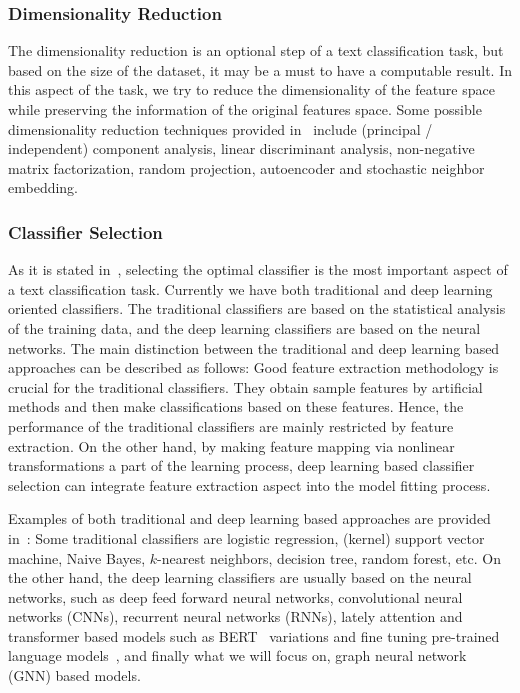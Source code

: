 \subsubsection{Dimensionality Reduction}
The dimensionality reduction is an optional step of a text classification task, but based on the size of the dataset, it may be a must to have a computable result. In this aspect of the task, we try to reduce the dimensionality of the feature space while preserving the information of the original features space. Some possible dimensionality reduction techniques provided in~\autocite{kowsari19tc} include (principal / independent) component analysis, linear discriminant analysis, non-negative matrix factorization, random projection, autoencoder and stochastic neighbor embedding.

\subsubsection{Classifier Selection}
As it is stated in~\autocite{li20tc}, selecting the optimal classifier is the most important aspect of a text classification task. Currently we have both traditional and deep learning oriented classifiers. The traditional classifiers are based on the statistical analysis of the training data, and the deep learning classifiers are based on the neural networks. The main distinction between the traditional and deep learning based approaches can be described as follows: Good feature extraction methodology is crucial for the traditional classifiers. They obtain sample features by artificial methods and then make classifications based on these features. Hence, the performance of the traditional classifiers are mainly restricted by feature extraction. On the other hand, by making feature mapping via nonlinear transformations a part of the learning process, deep learning based classifier selection can integrate feature extraction aspect into the model fitting process.

Examples of both traditional and deep learning based approaches are provided in~\autocite{kowsari19tc,li20tc,minaee20tc}: Some traditional classifiers are logistic regression, (kernel) support vector machine, Naive Bayes, \(k\)-nearest neighbors, decision tree, random forest, etc. On the other hand, the deep learning classifiers are usually based on the neural networks, such as deep feed forward neural networks, convolutional neural networks (CNNs), recurrent neural networks (RNNs), lately attention and transformer based models such as BERT~\autocite{devlin18bert} variations and fine tuning pre-trained language models~\autocite{howard18tc}, and finally what we will focus on, graph neural network (GNN) based models.

